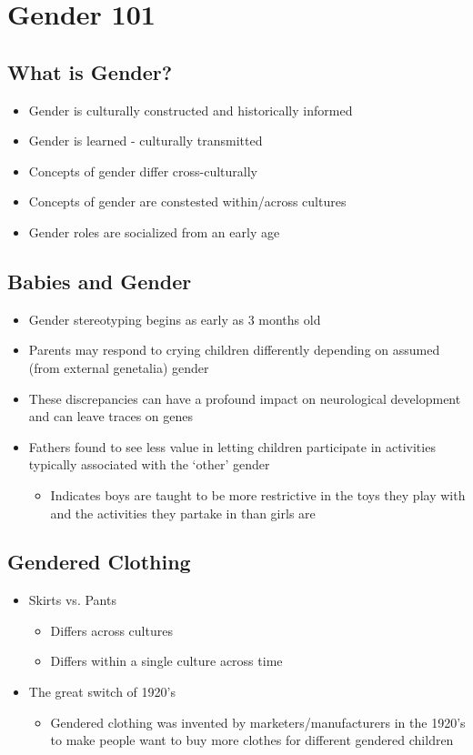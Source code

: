 \documentclass{article}
\begin{document}
\setcounter{section}{9} %
\section{Gender 101}

\subsection{What is Gender?}
\begin{itemize}
  \item Gender is culturally constructed and historically informed
  \item Gender is learned - culturally transmitted
  \item Concepts of gender differ cross-culturally
  \item Concepts of gender are constested within/across cultures
  \item Gender roles are socialized from an early age
\end{itemize}

\subsection{Babies and Gender}
\begin{itemize}
  \item Gender stereotyping begins as early as 3 months old
  \item Parents may respond to crying children differently depending on assumed (from external genetalia) gender
  \item These discrepancies can have a profound impact on neurological development and can leave traces on genes
  \item Fathers found to see less value in letting children participate in activities typically associated with the `other' gender \begin{itemize}
    \item Indicates boys are taught to be more restrictive in the toys they play with and the activities they partake in than girls are
  \end{itemize}
\end{itemize}

\subsection{Gendered Clothing}
\begin{itemize}
  \item Skirts vs. Pants \begin{itemize}
    \item Differs across cultures
    \item Differs within a single culture across time
  \end{itemize}
  \item The great switch of 1920's \begin{itemize}
    \item Gendered clothing was invented by marketers/manufacturers in the 1920's to make people want to buy more clothes for different gendered children
  \end{itemize}
\end{itemize}
\end{document}
